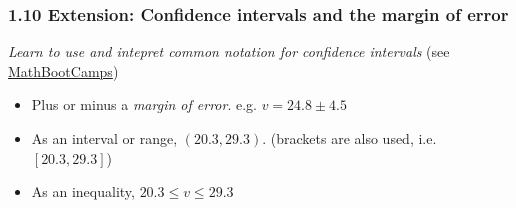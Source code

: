 
\usepackage[nomessages]{fp}%

\fancyhead[LE]{\thepage}



\subsubsection*{1.10 Extension: Confidence intervals and the margin of error}
\emph{Learn to use and intepret common notation for confidence intervals} (see \href{https://www.mathbootcamps.com/three-ways-write-confidence-interval/}{MathBootCamps})
\begin{itemize}
    \item Plus or minus a \emph{margin of error}. e.g. $v = 24.8 \pm 4.5$
    \item As an interval or range, $(20.3, 29.3)$. (brackets are also used, i.e. $[20.3, 29.3]$)
    \item As an inequality, $20.3 \leq v \leq 29.3$
\end{itemize} \vspace{1cm}

